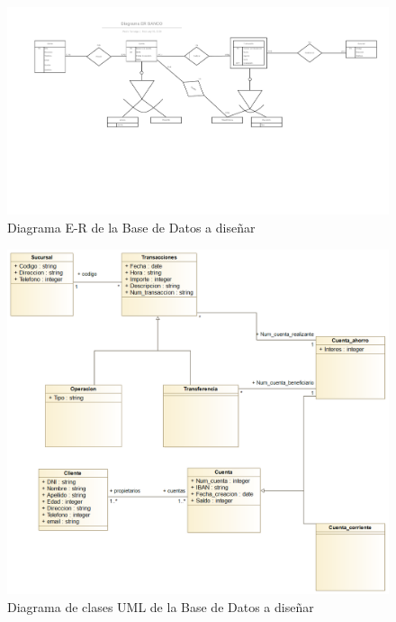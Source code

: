\documentclass{article}
\begin{document}
\begin{figure}[h!]
	\centering
		\includegraphics[scale=0.2]{images/diagramaer.png}
			\caption{Diagrama E-R de la Base de Datos a diseñar}
			\label{FIG:diagramaER}
\end{figure}

\begin{figure}[h!]
	\centering
		\includegraphics[scale=0.4]{images/diagramauml.png}
			\caption{Diagrama de clases UML de la Base de Datos a diseñar}
			\label{FIG:diagramaUML}
\end{figure}
\end{document}
